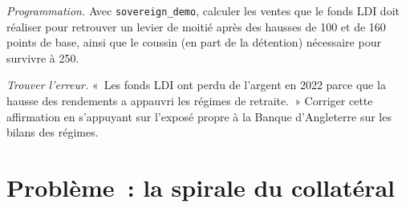\begin{exercise}[$\star\star\star$]\label{exo:m2:european-and-japanese-government-bonds:7}
\emph{Programmation.} Avec \texttt{sovereign\_demo}, calculer les ventes que le fonds LDI
doit réaliser pour retrouver un levier de moitié après des hausses de 100 et de 160 points
de base, ainsi que le coussin (en part de la détention) nécessaire pour survivre à 250.
\end{exercise}

\begin{exercise}[$\star\star\star$]\label{exo:m2:european-and-japanese-government-bonds:8}
\emph{Trouver l'erreur.} «~Les fonds LDI ont perdu de l'argent en 2022 parce que la hausse des rendements
a appauvri les régimes de retraite.~» Corriger cette affirmation en s'appuyant sur
l'exposé propre à la Banque d'Angleterre sur les bilans des régimes.
\end{exercise}

\section{Problème~: la spirale du collatéral}

